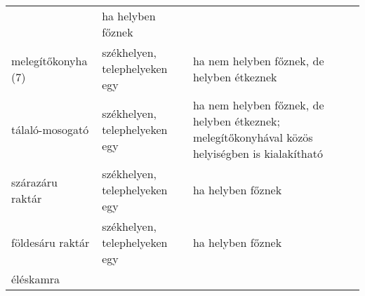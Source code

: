 \begin{longtable}[]{@{}lll@{}}
\begin{minipage}[t]{0.26\columnwidth}
\end{minipage} & \begin{minipage}[t]{0.51\columnwidth}\raggedright
ha helyben főznek\strut
\end{minipage}\tabularnewline
\begin{minipage}[t]{0.13\columnwidth}\raggedright
melegítőkonyha (7)\strut
\end{minipage} & \begin{minipage}[t]{0.26\columnwidth}\raggedright
székhelyen, telephelyeken egy\strut
\end{minipage} & \begin{minipage}[t]{0.51\columnwidth}\raggedright
ha nem helyben főznek, de helyben étkeznek\strut
\end{minipage}\tabularnewline
\begin{minipage}[t]{0.13\columnwidth}\raggedright
tálaló-mosogató\strut
\end{minipage} & \begin{minipage}[t]{0.26\columnwidth}\raggedright
székhelyen, telephelyeken egy\strut
\end{minipage} & \begin{minipage}[t]{0.51\columnwidth}\raggedright
ha nem helyben főznek, de helyben étkeznek; melegítőkonyhával közös
helyiségben is kialakítható\strut
\end{minipage}\tabularnewline
\begin{minipage}[t]{0.13\columnwidth}\raggedright
szárazáru raktár\strut
\end{minipage} & \begin{minipage}[t]{0.26\columnwidth}\raggedright
székhelyen, telephelyeken egy\strut
\end{minipage} & \begin{minipage}[t]{0.51\columnwidth}\raggedright
ha helyben főznek\strut
\end{minipage}\tabularnewline
\begin{minipage}[t]{0.13\columnwidth}\raggedright
földesáru raktár\strut
\end{minipage} & \begin{minipage}[t]{0.26\columnwidth}\raggedright
székhelyen, telephelyeken egy\strut
\end{minipage} & \begin{minipage}[t]{0.51\columnwidth}\raggedright
ha helyben főznek\strut
\end{minipage}\tabularnewline
\begin{minipage}[t]{0.13\columnwidth}\raggedright
éléskamra\strut
\end{minipage} & \begin{minipage}[t]{0.26\columnwidth}\raggedright

\end{minipage}
\end{longtable}
